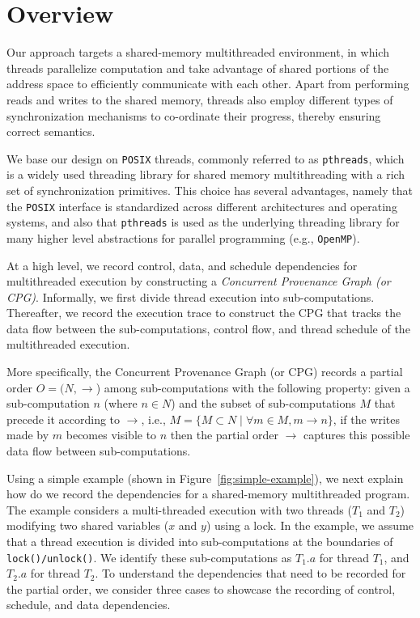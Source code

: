 \section{Overview}
\label{sec:overview}

Our approach targets a shared-memory multithreaded environment, in which threads parallelize computation and take 
advantage of shared portions of the address space to efficiently communicate with each other. Apart from performing reads 
and writes to the shared memory, threads also employ different types of synchronization mechanisms to 
co-ordinate their progress, thereby ensuring correct semantics. 

We base our design on {\tt POSIX} threads, commonly referred to as
{\tt pthreads}, which is a widely used threading library for shared memory
multithreading with a rich set of synchronization primitives.  This
choice has several advantages, namely that the {\tt POSIX} interface
is standardized across different architectures and operating systems, and also that {\tt pthreads} is used as the underlying threading
library for many higher level abstractions for parallel programming
(e.g., {\tt OpenMP}).

 At a high level, we record control, data, and schedule dependencies for multithreaded execution by constructing a {\em Concurrent Provenance Graph (or CPG)}. Informally, we first divide thread execution into sub-computations. Thereafter, we record the execution trace to construct the CPG that tracks the data flow between the sub-computations, control flow, and thread schedule  of the multithreaded execution.

More specifically, the Concurrent Provenance Graph (or CPG) records a partial order $O = (N, \rightarrow$) among sub-computations with the following property: given a sub-computation $n$ (where $n \in N $)  and the subset of sub-computations $M$ that precede it according to $\rightarrow$, i.e., $M = \{M \subset N \mid \forall m \in M, m \rightarrow n\}$, if the writes made by $m$ becomes visible to $n$ then the partial order $\rightarrow$ captures this possible data flow between sub-computations.




 Using a simple example (shown in Figure~\ref{fig:simple-example}), we next explain how do we record the dependencies for a shared-memory multithreaded program. The example considers a multi-threaded execution with two threads ($T_1$ and $T_2$) modifying two shared variables ($x$ and $y$) using a lock. In the example, we assume that a thread execution is divided into sub-computations at the boundaries of {\tt lock()/unlock()}. We identify these sub-computations as $T_1.a$ for thread $T_1$, and $T_2.a$ for thread $T_2$.   To understand the dependencies that need to be recorded for the partial order, we consider three cases to showcase the recording of control, schedule, and data dependencies.

